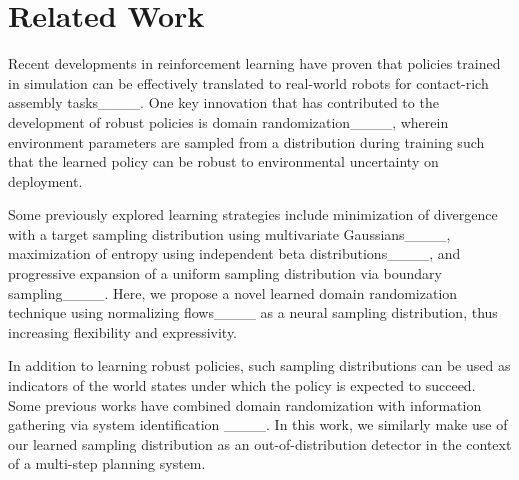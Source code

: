 \section{Related Work}
Recent developments in reinforcement learning have proven that policies trained in simulation can be effectively translated to real-world robots for contact-rich assembly tasks____. One key innovation that has contributed to the development of robust policies is domain randomization____, wherein environment parameters are sampled from a distribution during training such that the learned policy can be robust to environmental uncertainty on deployment. 

Some previously explored learning strategies include minimization of divergence with a target sampling distribution using multivariate Gaussians____, maximization of entropy using independent beta distributions____, and progressive expansion of a uniform sampling distribution via boundary sampling____. Here, we propose a novel learned domain randomization technique using normalizing flows____ as a neural sampling distribution, thus increasing flexibility and expressivity.

In addition to learning robust policies, such sampling distributions can be used as indicators of the world states under which the policy is expected to succeed. Some previous works have combined domain randomization with information gathering via system identification ____. In this work, we similarly make use of our learned sampling distribution as an out-of-distribution detector in the context of a multi-step planning system.